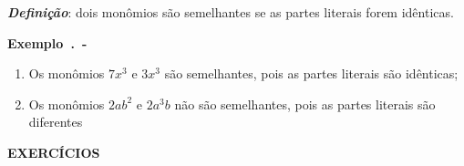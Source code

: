 \setlength{\parskip}{.5em}

\textbf{\textit{Definição}}: dois monômios são semelhantes se as partes literais forem idênticas.

\newpage

\textbf{Exemplo~\thesubsection.\theexemplo~-}
\settowidth{}
\begin{description}[leftmargin=\dimexpr\widest+\labelsep\relax,labelindent=0pt,
    labelwidth=\widest]
\item
\begin{enumerate}[label=(\textbf{\alph*)}]
    \item Os monômios $7x^3$ e $3x^3$ são semelhantes, pois as partes literais são idênticas;
    
    \item Os monômios  $2ab^2$ e $2a^3b$ não são semelhantes, pois as partes literais são diferentes \qedsymbol
\end{enumerate}

\end{description}

\noindent\textbf{EXERCÍCIOS \thesubsection}

\settowidth{}

